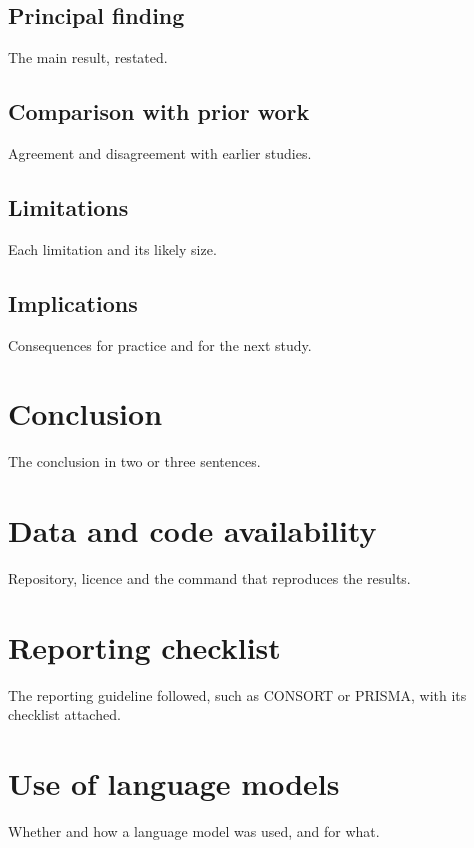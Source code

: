 \documentclass[11pt]{article}
\begin{document}
\subsection{Principal finding}
The main result, restated.

\subsection{Comparison with prior work}
Agreement and disagreement with earlier studies.

\subsection{Limitations}
Each limitation and its likely size.

\subsection{Implications}
Consequences for practice and for the next study.

\section{Conclusion}
The conclusion in two or three sentences.

\section*{Data and code availability}
Repository, licence and the command that reproduces the results.

\section*{Reporting checklist}
The reporting guideline followed, such as CONSORT or PRISMA, with its checklist attached.

\section*{Use of language models}
Whether and how a language model was used, and for what.
\end{document}
